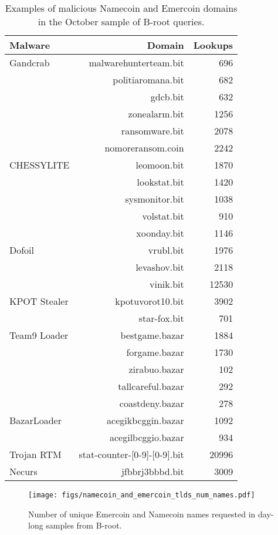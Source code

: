 \begin{table}
	\begin{tabular}{lrr}
		\toprule
		Malware & Domain & Lookups \\
		\midrule
		Gandcrab	&	malwarehunterteam.bit	&	696	\\
		&	politiaromana.bit	&	682	\\
		&	gdcb.bit	&	632	\\
		&	zonealarm.bit	&	1256	\\
		&	ransomware.bit	&	2078	\\
		&	nomoreransom.coin	&	2242	\\
		CHESSYLITE	&	leomoon.bit	&	1870	\\
		&	lookstat.bit	&	1420	\\
		&	sysmonitor.bit	&	1038	\\
		&	volstat.bit	&	910	\\
		&	xoonday.bit	&	1146	\\
		Dofoil	&	vrubl.bit	&	1976	\\
		&	levashov.bit	&	2118	\\
		&	vinik.bit	&	12530	\\
		KPOT Stealer	&	kpotuvorot10.bit	&	3902	\\
		&	star-fox.bit	&	701	\\
		Team9 Loader	&	bestgame.bazar	&	1884	\\
		&	forgame.bazar	&	1730	\\
		&	zirabuo.bazar	&	102	\\
		&	tallcareful.bazar	&	292	\\
		&	coastdeny.bazar	&	278	\\
		BazarLoader	&	acegikbcggin.bazar	&	1092	\\
		&	acegilbcggio.bazar	&	934	\\
		Trojan RTM	&	stat-counter-[0-9]-[0-9].bit	&	20996	\\
		Necurs	&	jfbbrj3bbbd.bit	&	3009	\\
		\bottomrule
	\end{tabular}
	\caption{Examples of malicious Namecoin and Emercoin domains in the October 
	sample of B-root 
		queries.}
	\label{tab:namecoin_emercoin}
\end{table}

\begin{figure}[t]
	\centering
	\texttt{[image: figs/namecoin\_and\_emercoin\_tlds\_num\_names.pdf]}
	\caption{Number of unique Emercoin and Namecoin names requested in day-long 
		samples from B-root.}
	\label{fig:namecoin_and_emercoin_names}
\end{figure}

